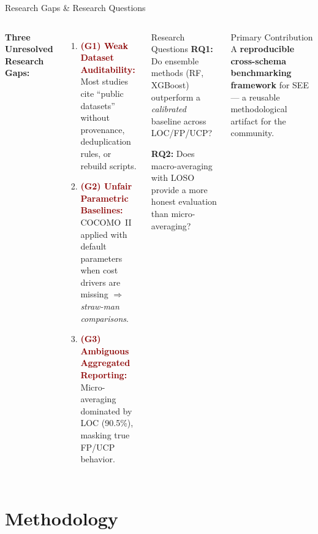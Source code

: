 \documentclass[aspectratio=169]{beamer}
\begin{document}
\begin{frame}{Research Gaps \& Research Questions}
\begin{columns}[T]
\textbf{Three Unresolved Research Gaps:}

\vspace{0.25cm}
\begin{enumerate}
    \item \textcolor{darkred}{\textbf{(G1) Weak Dataset Auditability:}}\\
    Most studies cite ``public datasets'' without provenance, deduplication rules, or rebuild scripts.

    \vspace{0.2cm}
    \item \textcolor{darkred}{\textbf{(G2) Unfair Parametric Baselines:}}\\
    COCOMO~II applied with default parameters when cost drivers are missing $\Rightarrow$ \textit{straw-man comparisons}.

    \vspace{0.2cm}
    \item \textcolor{darkred}{\textbf{(G3) Ambiguous Aggregated Reporting:}}\\
    Micro-averaging dominated by LOC (90.5\%), masking true FP/UCP behavior.
\end{enumerate}

\begin{exampleblock}{Research Questions}
\small\textbf{RQ1:} Do ensemble methods (RF, XGBoost) outperform a \emph{calibrated} baseline across LOC/FP/UCP?

\vspace{0.1cm}
\small\textbf{RQ2:} Does macro-averaging with LOSO provide a more honest evaluation than micro-averaging?
\end{exampleblock}

\vspace{0.15cm}
\begin{block}{Primary Contribution}
\small A \textbf{reproducible cross-schema benchmarking framework} for SEE --- a reusable methodological artifact for the community.
\end{block}
\end{columns}
\end{frame}

\section{Methodology}
\end{document}
